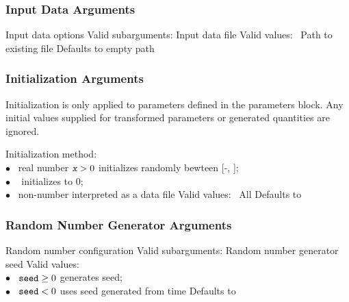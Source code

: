 \subsubsection{Input Data Arguments}

\begin{description}

  {Input data options}
  {Valid subarguments: }
%
    {Input data file}
    {Valid values: \  Path to existing file}
    {Defaults to empty path}
%
\end{description}

\subsubsection{Initialization Arguments}

Initialization is only applied to parameters defined in the parameters
block.  Any initial values supplied for transformed parameters or
generated quantities are ignored.

\begin{description}
  {Initialization method: \\
        \hspace*{8pt} $\bullet$ \ real number $\mbox{\farg{x}} > 0$ initializes randomly bewteen [-,
        ];
        \\
        \hspace*{8pt} $\bullet$ \   initializes to 0;
        \\
        \hspace*{8pt} $\bullet$ \  non-number interpreted as a data file}
  {Valid values: \  All}
  {Defaults to }
%
\end{description}


\subsubsection{Random Number Generator Arguments}

\begin{description}

  {Random number configuration}
  {Valid subarguments: }
%
    {Random number generator seed}
    {Valid values: \\
      \hspace*{8pt} $\bullet$ \ $\mbox{{\tt seed}} \geq 0$ generates seed;
      \\
      \hspace*{8pt} $\bullet$ \ $\mbox{{\tt seed}} < 0$ uses seed generated from time}
    {Defaults to }
%
\end{description}

